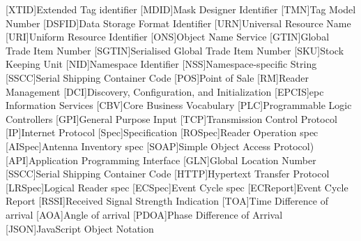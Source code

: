\begin{multicols}{2}
\begin{acronym}[AAAAAA]
	[XTID]{Extended Tag identifier}
	[MDID]{Mask Designer Identifier}
	[TMN]{Tag Model Number}
	[DSFID]{Data Storage Format Identifier}
	[URN]{Universal Resource Name}
	[URI]{Uniform Resource Identifier}
	[ONS]{Object Name Service}
	[GTIN]{Global Trade Item Number}
	[SGTIN]{Serialised Global Trade Item Number}
	[SKU]{Stock Keeping Unit}
	[NID]{Namespace Identifier}
	[NSS]{Namespace-specific String}
	[SSCC]{Serial Shipping Container Code}
	[POS]{Point of Sale}
	[RM]{Reader Management}
	[DCI]{Discovery, Configuration, and 
	Initialization}
	[EPCIS]{\ac{epc} Information Services}
	[CBV]{Core Business Vocabulary}
	[PLC]{Programmable Logic Controllers}
	[GPI]{General Purpose Input}
	[TCP]{Transmission Control Protocol}
	[IP]{Internet Protocol}
	[Spec]{Specification}
	[ROSpec]{Reader Operation \acs{spec}}
	[AISpec]{Antenna Inventory \acs{spec}}
	[SOAP]{Simple Object Access Protocol)}
	[API]{Application Programming Interface}
	[GLN]{Global Location Number}
	[SSCC]{Serial Shipping Container Code}
	[HTTP]{Hypertext Transfer Protocol}
	[LRSpec]{Logical Reader \ac{spec}}
	[ECSpec]{Event Cycle \ac{spec}}
	[ECReport]{Event Cycle Report}
	[RSSI]{Received Signal Strength Indication}
	[TOA]{Time Difference of arrival}
	[AOA]{Angle of arrival}
	[PDOA]{Phase Difference of Arrival}
	[JSON]{JavaScript Object Notation}
\end{acronym}
\end{multicols}

